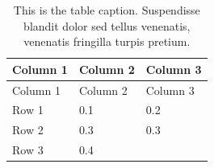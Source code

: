 \documentclass[12pt,a4paper,]{report}
\begin{document}
\begin{longtable}[]{@{}lll@{}}
\caption{This is the table caption. Suspendisse blandit dolor sed tellus
venenatis, venenatis fringilla turpis pretium.
\label{ref_a_table}}\tabularnewline
\toprule
\begin{minipage}[b]{0.25\columnwidth}\raggedright\strut
Column 1
\strut\end{minipage} &
\begin{minipage}[b]{0.30\columnwidth}\raggedright\strut
Column 2
\strut\end{minipage} &
\begin{minipage}[b]{0.24\columnwidth}\raggedright\strut
Column 3
\strut\end{minipage}\tabularnewline
\midrule
\endfirsthead
\toprule
\begin{minipage}[b]{0.25\columnwidth}\raggedright\strut
Column 1
\strut\end{minipage} &
\begin{minipage}[b]{0.30\columnwidth}\raggedright\strut
Column 2
\strut\end{minipage} &
\begin{minipage}[b]{0.24\columnwidth}\raggedright\strut
Column 3
\strut\end{minipage}\tabularnewline
\midrule
\endhead
\begin{minipage}[t]{0.25\columnwidth}\raggedright\strut
Row 1
\strut\end{minipage} &
\begin{minipage}[t]{0.30\columnwidth}\raggedright\strut
0.1
\strut\end{minipage} &
\begin{minipage}[t]{0.24\columnwidth}\raggedright\strut
0.2
\strut\end{minipage}\tabularnewline
\begin{minipage}[t]{0.25\columnwidth}\raggedright\strut
Row 2
\strut\end{minipage} &
\begin{minipage}[t]{0.30\columnwidth}\raggedright\strut
0.3
\strut\end{minipage} &
\begin{minipage}[t]{0.24\columnwidth}\raggedright\strut
0.3
\strut\end{minipage}\tabularnewline
\begin{minipage}[t]{0.25\columnwidth}\raggedright\strut
Row 3
\strut\end{minipage} &
\begin{minipage}[t]{0.30\columnwidth}\raggedright\strut
0.4
\strut\end{minipage} &

\end{longtable}
\end{document}
